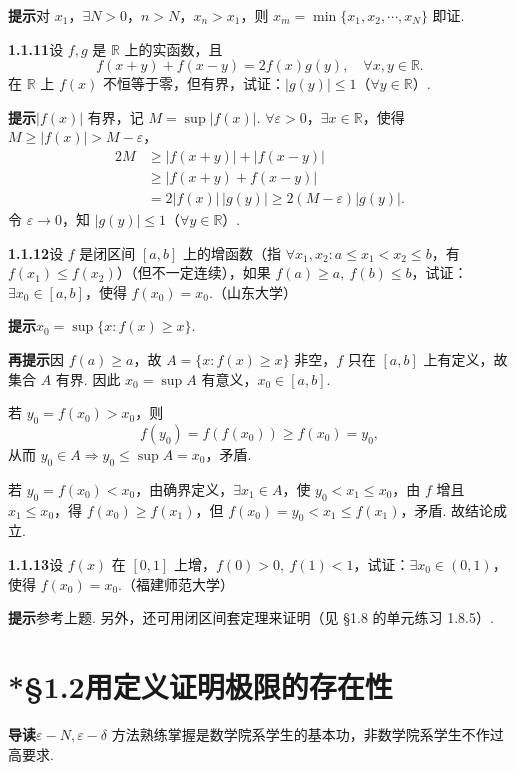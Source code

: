 \documentclass[UTF8, 12pt, fontset=fandol, oneside]{ctexart}
\begin{document}
\noindent\textbf{提示}\quad 对 $x_1$，$\exists N>0$，$n>N$，$x_n>x_1$，则 $x_m=\min\{x_1,x_2,\cdots,x_N\}$ 即证.

\noindent\textbf{1.1.11}\quad 设 $f,g$ 是 $\mathbb{R}$ 上的实函数，且
\[
  f(x+y)+f(x-y)=2f(x)g(y),\quad \forall x,y\in\mathbb{R}.
\]
在 $\mathbb{R}$ 上 $f(x)$ 不恒等于零，但有界，试证：$|g(y)|\le1$（$\forall y\in\mathbb{R}$）.

\noindent\textbf{提示}\quad $|f(x)|$ 有界，记 $M=\sup|f(x)|$. $\forall\varepsilon>0$，$\exists x\in\mathbb{R}$，使得 $M\ge |f(x)|>M-\varepsilon$，
\[
\begin{aligned}
2M&\ge |f(x+y)|+|f(x-y)|\\
&\ge |f(x+y)+f(x-y)|\\
&=2|f(x)|\,|g(y)|\ge 2(M-\varepsilon)|g(y)|.
\end{aligned}
\]
令 $\varepsilon\to0$，知 $|g(y)|\le1$（$\forall y\in\mathbb{R}$）.

\noindent\textbf{1.1.12}\quad 设 $f$ 是闭区间 $[a,b]$ 上的增函数（指 $\forall x_1,x_2:a\le x_1<x_2\le b$，有 $f(x_1)\le f(x_2)$）（但不一定连续），如果 $f(a)\ge a,\ f(b)\le b$，试证：$\exists x_0\in[a,b]$，使得 $f(x_0)=x_0$.（山东大学）

\noindent\textbf{提示}\quad $x_0=\sup\{x:f(x)\ge x\}$.

\noindent\textbf{再提示}\quad 因 $f(a)\ge a$，故 $A=\{x:f(x)\ge x\}$ 非空，$f$ 只在 $[a,b]$ 上有定义，故集合 $A$ 有界. 因此 $x_0=\sup A$ 有意义，$x_0\in[a,b]$.

若 $y_0=f(x_0)>x_0$，则
\[
  f(y_0)=f(f(x_0))\ge f(x_0)=y_0,
\]
从而 $y_0\in A\Rightarrow y_0\le\sup A=x_0$，矛盾.

若 $y_0=f(x_0)<x_0$，由确界定义，$\exists x_1\in A$，使 $y_0<x_1\le x_0$，由 $f$ 增且 $x_1\le x_0$，得 $f(x_0)\ge f(x_1)$，但 $f(x_0)=y_0<x_1\le f(x_1)$，矛盾. 故结论成立.

\noindent\textbf{1.1.13}\quad 设 $f(x)$ 在 $[0,1]$ 上增，$f(0)>0,\ f(1)<1$，试证：$\exists x_0\in(0,1)$，使得 $f(x_0)=x_0$.（福建师范大学）

\noindent\textbf{提示}\quad 参考上题. 另外，还可用闭区间套定理来证明（见 §1.8 的单元练习 1.8.5）.

\section*{*§1.2\quad 用定义证明极限的存在性}

\noindent\textbf{导读}\quad $\varepsilon-N,\varepsilon-\delta$ 方法熟练掌握是数学院系学生的基本功，非数学院系学生不作过高要求.
\end{document}
